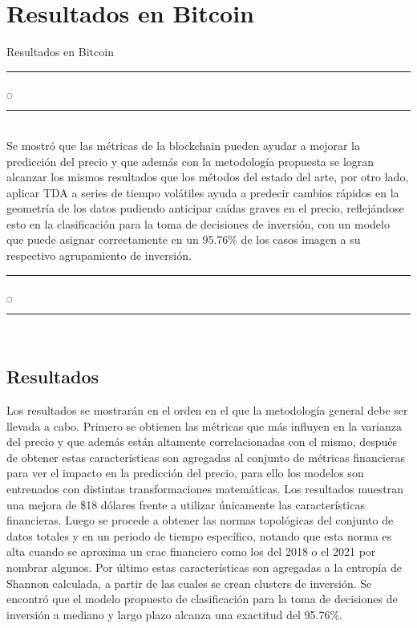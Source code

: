 \chapter[Resultados]{Resultados en Bitcoin}{Resultados en Bitcoin}\label{Resultados}

\noindent
\rule{0.49\textwidth}{0.75pt} $_{\bigcirc}$ \rule{0.49\textwidth}{0.75pt}\\

Se mostró que las métricas de la blockchain pueden ayudar a mejorar la predicción del precio y que además con la metodología propuesta se logran alcanzar los mismos resultados que los métodos del estado del arte, por otro lado, aplicar TDA a series de tiempo volátiles ayuda a predecir cambios rápidos en la geometría de los datos pudiendo anticipar caídas graves en el precio, reflejándose esto en la clasificación para la toma de decisiones de inversión, con un modelo que puede asignar correctamente en un 95.76\% de los casos imagen a su respectivo agrupamiento de inversión.\\

\noindent
\rule{0.49\textwidth}{0.75pt} $_{\bigcirc}$ \rule{0.49\textwidth}{0.75pt}\\
\clearpage

\section{Resultados}
\label{subResultados}
Los resultados se mostrarán en el orden en el que la metodología general debe ser llevada a cabo. Primero se obtienen las métricas que más influyen en la varianza del precio y que además están altamente correlacionadas con el mismo, después de obtener estas características son agregadas al conjunto de métricas financieras para ver el impacto en la predicción del precio, para ello los modelos son entrenados con distintas transformaciones matemáticas. Los resultados muestran una mejora de \$18 dólares frente a utilizar únicamente las características financieras. Luego se procede a obtener las normas topológicas del conjunto de datos totales y en un periodo de tiempo específico, notando que esta norma es alta cuando se aproxima un crac financiero como los del 2018 o el 2021 por nombrar algunos. Por último estas características son agregadas a la entropía de Shannon calculada, a partir de las cuales se crean clusters de inversión. Se encontró que el modelo propuesto de clasificación para la toma de decisiones de inversión a mediano y largo plazo alcanza una exactitud del 95.76\%.

